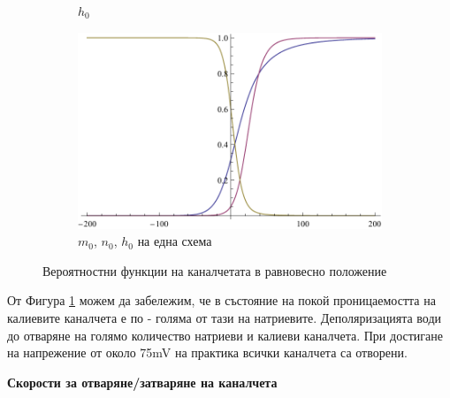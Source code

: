 \documentclass{article}
\numberwithin{equation}{section}
\begin{document}
\begin{figure}[H]
\begin{subfigure}[t]{0.3\textwidth}
            \caption{$h_0$}
        \end{subfigure}
        \begin{subfigure}[t]{0.3\textwidth}
            \includegraphics[width=\textwidth]{./schemas/chanels_combined.pdf}
            \caption{$m_0$, $n_0$, $h_0$ на една схема}
        \end{subfigure}
        \caption{Вероятностни функции на каналчетата в равновесно положение}\label{fig:chanel_prob}
    \end{figure}
    
    От Фигура \ref{fig:chanel_prob} можем да забележим, че в състояние на покой проницаемостта на калиевите каналчета е по - голяма от тази
    на натриевите. Деполяризацията води до отваряне на голямо количество натриеви и калиеви каналчета. При достигане на напрежение от около
    75mV на практика всички каналчета са отворени.

    \vspace{5mm} %
    \textbf{Скорости за отваряне/затваряне на каналчета}
    
\end{document}
